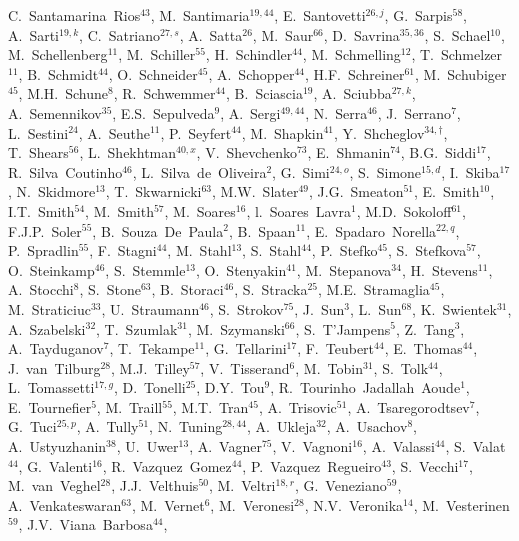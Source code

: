 \begin{flushleft}
C.~Santamarina~Rios$^{43}$,
M.~Santimaria$^{19,44}$,
E.~Santovetti$^{26,j}$,
G.~Sarpis$^{58}$,
A.~Sarti$^{19,k}$,
C.~Satriano$^{27,s}$,
A.~Satta$^{26}$,
M.~Saur$^{66}$,
D.~Savrina$^{35,36}$,
S.~Schael$^{10}$,
M.~Schellenberg$^{11}$,
M.~Schiller$^{55}$,
H.~Schindler$^{44}$,
M.~Schmelling$^{12}$,
T.~Schmelzer$^{11}$,
B.~Schmidt$^{44}$,
O.~Schneider$^{45}$,
A.~Schopper$^{44}$,
H.F.~Schreiner$^{61}$,
M.~Schubiger$^{45}$,
M.H.~Schune$^{8}$,
R.~Schwemmer$^{44}$,
B.~Sciascia$^{19}$,
A.~Sciubba$^{27,k}$,
A.~Semennikov$^{35}$,
E.S.~Sepulveda$^{9}$,
A.~Sergi$^{49,44}$,
N.~Serra$^{46}$,
J.~Serrano$^{7}$,
L.~Sestini$^{24}$,
A.~Seuthe$^{11}$,
P.~Seyfert$^{44}$,
M.~Shapkin$^{41}$,
Y.~Shcheglov$^{34,\dagger}$,
T.~Shears$^{56}$,
L.~Shekhtman$^{40,x}$,
V.~Shevchenko$^{73}$,
E.~Shmanin$^{74}$,
B.G.~Siddi$^{17}$,
R.~Silva~Coutinho$^{46}$,
L.~Silva~de~Oliveira$^{2}$,
G.~Simi$^{24,o}$,
S.~Simone$^{15,d}$,
I.~Skiba$^{17}$,
N.~Skidmore$^{13}$,
T.~Skwarnicki$^{63}$,
M.W.~Slater$^{49}$,
J.G.~Smeaton$^{51}$,
E.~Smith$^{10}$,
I.T.~Smith$^{54}$,
M.~Smith$^{57}$,
M.~Soares$^{16}$,
l.~Soares~Lavra$^{1}$,
M.D.~Sokoloff$^{61}$,
F.J.P.~Soler$^{55}$,
B.~Souza~De~Paula$^{2}$,
B.~Spaan$^{11}$,
E.~Spadaro~Norella$^{22,q}$,
P.~Spradlin$^{55}$,
F.~Stagni$^{44}$,
M.~Stahl$^{13}$,
S.~Stahl$^{44}$,
P.~Stefko$^{45}$,
S.~Stefkova$^{57}$,
O.~Steinkamp$^{46}$,
S.~Stemmle$^{13}$,
O.~Stenyakin$^{41}$,
M.~Stepanova$^{34}$,
H.~Stevens$^{11}$,
A.~Stocchi$^{8}$,
S.~Stone$^{63}$,
B.~Storaci$^{46}$,
S.~Stracka$^{25}$,
M.E.~Stramaglia$^{45}$,
M.~Straticiuc$^{33}$,
U.~Straumann$^{46}$,
S.~Strokov$^{75}$,
J.~Sun$^{3}$,
L.~Sun$^{68}$,
K.~Swientek$^{31}$,
A.~Szabelski$^{32}$,
T.~Szumlak$^{31}$,
M.~Szymanski$^{66}$,
S.~T'Jampens$^{5}$,
Z.~Tang$^{3}$,
A.~Tayduganov$^{7}$,
T.~Tekampe$^{11}$,
G.~Tellarini$^{17}$,
F.~Teubert$^{44}$,
E.~Thomas$^{44}$,
J.~van~Tilburg$^{28}$,
M.J.~Tilley$^{57}$,
V.~Tisserand$^{6}$,
M.~Tobin$^{31}$,
S.~Tolk$^{44}$,
L.~Tomassetti$^{17,g}$,
D.~Tonelli$^{25}$,
D.Y.~Tou$^{9}$,
R.~Tourinho~Jadallah~Aoude$^{1}$,
E.~Tournefier$^{5}$,
M.~Traill$^{55}$,
M.T.~Tran$^{45}$,
A.~Trisovic$^{51}$,
A.~Tsaregorodtsev$^{7}$,
G.~Tuci$^{25,p}$,
A.~Tully$^{51}$,
N.~Tuning$^{28,44}$,
A.~Ukleja$^{32}$,
A.~Usachov$^{8}$,
A.~Ustyuzhanin$^{38}$,
U.~Uwer$^{13}$,
A.~Vagner$^{75}$,
V.~Vagnoni$^{16}$,
A.~Valassi$^{44}$,
S.~Valat$^{44}$,
G.~Valenti$^{16}$,
R.~Vazquez~Gomez$^{44}$,
P.~Vazquez~Regueiro$^{43}$,
S.~Vecchi$^{17}$,
M.~van~Veghel$^{28}$,
J.J.~Velthuis$^{50}$,
M.~Veltri$^{18,r}$,
G.~Veneziano$^{59}$,
A.~Venkateswaran$^{63}$,
M.~Vernet$^{6}$,
M.~Veronesi$^{28}$,
N.V.~Veronika$^{14}$,
M.~Vesterinen$^{59}$,
J.V.~Viana~Barbosa$^{44}$,

\end{flushleft}
